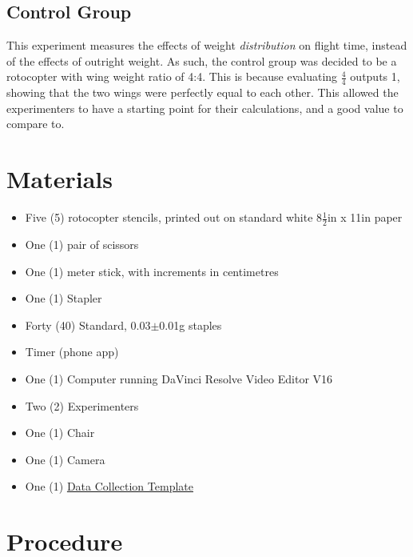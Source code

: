 \documentclass[]{article}
\theoremstyle{definition}
\begin{document}
\subsection{Control Group}
This experiment measures the effects of weight \textit{distribution} on flight time, instead of the effects of outright weight. As such, the control group was decided to be a rotocopter with wing weight ratio of 4:4. This is because evaluating $\frac{4}{4}$ outputs 1, showing that the two wings were perfectly equal to each other. This allowed the experimenters to have a starting point for their calculations, and a good value to compare to.

\section{Materials}
\begin{itemize}
    \item Five (5) rotocopter stencils, printed out on standard white $8\frac{1}{2}$in x 11in paper
    \item One (1) pair of scissors
    \item One (1) meter stick, with increments in centimetres
    \item One (1) Stapler 
    \item Forty (40) Standard, 0.03$\pm$0.01g staples
    \item Timer (phone app) 
    \item One (1) Computer running DaVinci Resolve Video Editor V16
    \item Two (2) Experimenters
    \item One (1) Chair
    \item One (1) Camera
    \item One (1) \href{https://docs.google.com/spreadsheets/d/1fByH_D420FM5xx0zt5tHyaEZ7hWkV1IXYVKtugBasig/edit?usp=sharing}{Data Collection Template}
\end{itemize} 

\section{Procedure} \label{Procedure}
\end{document}
